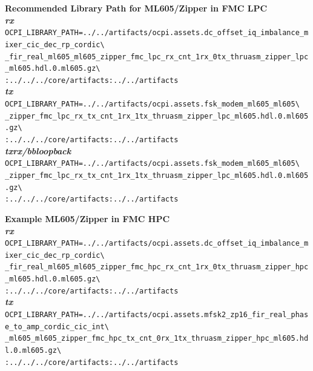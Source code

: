 \begin{appendices}
\textbf{Recommended Library Path for ML605/Zipper in FMC LPC}\\

\textbf{\textit{rx}}\\
\verb|OCPI_LIBRARY_PATH=../../artifacts/ocpi.assets.dc_offset_iq_imbalance_mixer_cic_dec_rp_cordic\| \\
\verb|_fir_real_ml605_ml605_zipper_fmc_lpc_rx_cnt_1rx_0tx_thruasm_zipper_lpc_ml605.hdl.0.ml605.gz\| \\
\verb|:../../../core/artifacts:../../artifacts| \\

\textbf{\textit{tx}}\\
\verb|OCPI_LIBRARY_PATH=../../artifacts/ocpi.assets.fsk_modem_ml605_ml605\| \\
\verb|_zipper_fmc_lpc_rx_tx_cnt_1rx_1tx_thruasm_zipper_lpc_ml605.hdl.0.ml605.gz\| \\
\verb|:../../../core/artifacts:../../artifacts| \\

\textbf{\textit{txrx/bbloopback}}\\
\verb|OCPI_LIBRARY_PATH=../../artifacts/ocpi.assets.fsk_modem_ml605_ml605\| \\
\verb|_zipper_fmc_lpc_rx_tx_cnt_1rx_1tx_thruasm_zipper_lpc_ml605.hdl.0.ml605.gz\| \\
\verb|:../../../core/artifacts:../../artifacts| \\
\par\medskip

\textbf{Example ML605/Zipper in FMC HPC}\\
\textbf{\textit{rx}}\\
\verb|OCPI_LIBRARY_PATH=../../artifacts/ocpi.assets.dc_offset_iq_imbalance_mixer_cic_dec_rp_cordic\| \\
\verb|_fir_real_ml605_ml605_zipper_fmc_hpc_rx_cnt_1rx_0tx_thruasm_zipper_hpc_ml605.hdl.0.ml605.gz\| \\
\verb|:../../../core/artifacts:../../artifacts| \\

\textbf{\textit{tx}}\\
\verb|OCPI_LIBRARY_PATH=../../artifacts/ocpi.assets.mfsk2_zp16_fir_real_phase_to_amp_cordic_cic_int\| \\
\verb|_ml605_ml605_zipper_fmc_hpc_tx_cnt_0rx_1tx_thruasm_zipper_hpc_ml605.hdl.0.ml605.gz\| \\
\verb|:../../../core/artifacts:../../artifacts| \\


\end{appendices}
